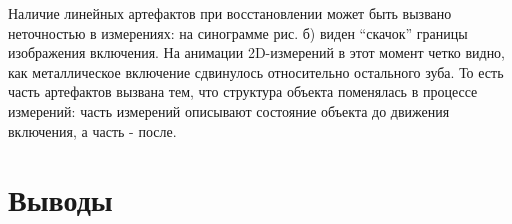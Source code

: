 Наличие линейных артефактов при восстановлении может быть вызвано неточностью в измерениях: на синограмме рис. \label{fig:sino_zub} б) виден ``скачок'' границы изображения включения.
На анимации 2D-измерений в этот момент четко видно, как металлическое включение сдвинулось относительно остального зуба.
То есть часть артефактов вызвана тем, что структура объекта поменялась в процессе измерений: часть измерений описывают состояние объекта до движения включения, а часть - после.

\section{Выводы}

